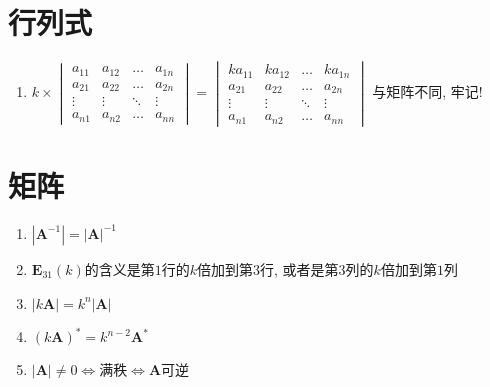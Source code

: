 \chapter{行列式}
\begin{enumerate}
\item $k \times
\begin{vmatrix}
a_{11} & a_{12} & \dots & a_{1n} \\
a_{21} & a_{22} & \dots & a_{2n} \\
\vdots & \vdots & \ddots & \vdots \\
a_{n1} & a_{n2} & \dots & a_{nn}
\end{vmatrix} =
\begin{vmatrix}
ka_{11} & ka_{12} & \dots & ka_{1n} \\
a_{21} & a_{22} & \dots & a_{2n} \\
\vdots & \vdots & \ddots & \vdots \\
a_{n1} & a_{n2} & \dots & a_{nn}
\end{vmatrix} $
与矩阵不同, 牢记!
\end{enumerate}
\chapter{矩阵}
\begin{enumerate}
\item $|\bm{A}^{-1}|=|\bm{A}|^{-1}$
\item $\bm{E}_{31}(k)$的含义是第$1$行的$k$倍加到第$3$行, 或者是第$3$列的$k$倍加到第$1$列
\item $|k \bm{A}|=k^{n}|\bm{A}|$
\item $(k \bm{A})^{*}=k^{n-2} \bm{A}^{*}$
\item $|\bm{A}|\neq 0\Leftrightarrow$满秩$\Leftrightarrow \bm{A}$可逆
\end{enumerate}
